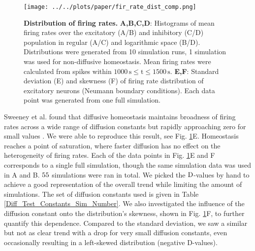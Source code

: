 \documentclass[10pt,letterpaper]{article}
\begin{document}
\begin{figure}
\begin{center}
\texttt{[image: ../../plots/paper/fir\_rate\_dist\_comp.png]}
\end{center}
\caption{{\bf Distribution of firing rates.} \textbf{A,B,C,D}: Histograms of mean firing rates over the excitatory (A/B) and inhibitory (C/D) population in regular (A/C) and logarithmic space (B/D). Distributions were generated from 10 simulation runs, 1 simulation was used for non-diffusive homeostasis. Mean firing rates were calculated from spikes within $\mathrm{1000\,s \leq t \leq 1500\,s}$. \textbf{E,F}: Standard deviation (E) and skewness (F) of firing rate distribution of excitatory neurons (Neumann boundary conditions). Each data point was generated from one full simulation.}
\label{Fir_Rate_Dist_Comp}
\end{figure}

Sweeney et al. found that diffusive homeostasis maintains broadness of firing rates across a wide range of diffusion constants but rapidly approaching zero for small values \cite[p. 6]{Sweeney_Paper}. We were able to reproduce this result, see Fig. \ref{Fir_Rate_Dist_Comp}E. Homeostasis reaches a point of saturation, where faster diffusion has no effect on the heterogeneity of firing rates. Each of the data points in Fig. \ref{Fir_Rate_Dist_Comp}E and F corresponds to a single full simulation, though the same simulation data was used in A and B. $\rm 55$ simulations were ran in total. We picked the $\rm D$-values by hand to achieve a good representation of the overall trend while limiting the amount of simulations. The set of diffusion constants used is given in Table \ref{Diff_Test_Constants_Sim_Number}.
We also investigated the influence of the diffusion constant onto the distribution's skewness, shown in Fig. \ref{Fir_Rate_Dist_Comp}F, to further quantify this dependence. Compared to the standard deviation, we saw a similar but not as clear trend with a drop for very small diffusion constants, even occasionally resulting in a left-skewed distribution (negative D-values).
\end{document}
